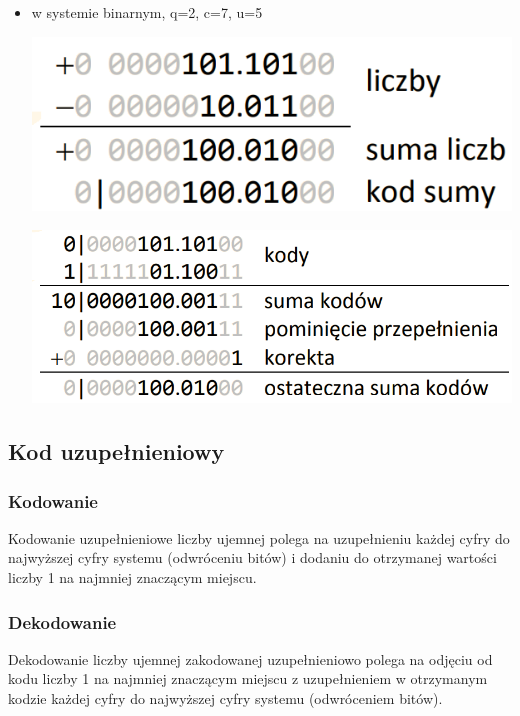 \documentclass[12pt]{article}
\begin{document}
\begin{itemize}
        \item w systemie binarnym, q=2, c=7, u=5
        \begin{center}
            \includegraphics[scale=0.4]{graphics/number-repr/odw-add-bin.png}
        \end{center}
        \begin{center}
            \includegraphics[scale=0.4]{graphics/number-repr/odw-add-bin-2.png}
        \end{center}
        
    \end{itemize}
    
    
    \subsection{Kod uzupełnieniowy}
    \subsubsection{Kodowanie}
        Kodowanie uzupełnieniowe liczby ujemnej polega na uzupełnieniu każdej cyfry do najwyższej
        cyfry systemu (odwróceniu bitów) i dodaniu do
        otrzymanej wartości liczby 1 na najmniej znaczącym miejscu.
    \subsubsection{Dekodowanie}
        Dekodowanie liczby ujemnej zakodowanej uzupełnieniowo polega na odjęciu od kodu liczby 1
        na najmniej znaczącym miejscu z uzupełnieniem
        w otrzymanym kodzie każdej cyfry do najwyższej
        cyfry systemu (odwróceniem bitów).
        
\end{document}
